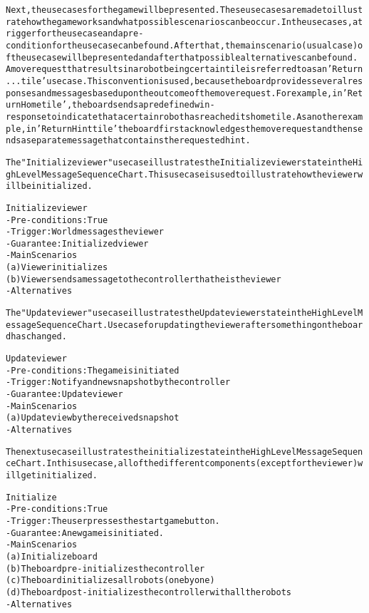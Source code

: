 \begin{alltt}
\rm
Next, the use cases for the game will be presented. These use cases are made to illustrate how the game works and what possible scenarios can be occur. In the use cases, a trigger for the use case and a pre-condition for the use case can be found. After that, the main scenario (usual case) of the use case will be presented and after that possible alternatives can be found. \\
A move request that results in a robot being  certain tile is referred to as an 'Return ... tile' use case. This convention is used, because the board provides several responses and messages based upon the outcome of the move request. For example, in 'Return Home tile', the board sends a predefined win-response to indicate that a certain robot has reached its home tile. As another example, in 'Return Hint tile' the board first acknowledges the move request and then sends a separate message that contains the requested hint.

The "Initialize viewer" use case illustrates the Initialize viewer state in the High Level Message Sequence Chart. This use case is used to illustrate how the viewer will be initialized.

Initialize viewer
- Pre-conditions: True
- Trigger: World messages the viewer
- Guarantee: Initialized viewer
- Main Scenarios
    (a) Viewer initializes
    (b) Viewer sends a message to the controller that he is the viewer
- Alternatives

The "Update viewer" use case illustrates the Update viewer state in the High Level Message Sequence Chart. Use case for updating the viewer after something on the board has changed.

Update viewer
- Pre-conditions: The game is initiated
- Trigger: Notify and new snapshot by the controller
- Guarantee: Update viewer
- Main Scenarios
    (a) Update view by the received snapshot
- Alternatives

The next use case illustrates the initialize state in the High Level Message Sequence Chart. In this use case, all of the different components (except for the viewer) will get initialized.

Initialize
- Pre-conditions: True
- Trigger: The user presses the start game button.
- Guarantee: A new game is initiated.
- Main Scenarios
    (a) Initialize board
    (b) The board pre-initializes the controller
    (c) The board initializes all robots (one by one)
    (d) The board post-initializes the controller with all the robots
- Alternatives


\end{alltt}
